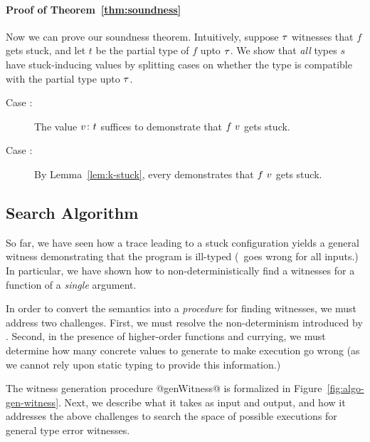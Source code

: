 \paragraph{Proof of Theorem~\ref{thm:soundness}}
%
Now we can prove our soundness theorem. Intuitively, suppose $\tau$
witnesses that $f$ gets stuck, and let $t$ be the partial type of $f$
upto $\tau$. We show that \emph{all} types $s$ have stuck-inducing
values by splitting cases on whether the type is compatible with the
partial type upto $\tau$.
%
\begin{description}
  \item[Case :]
   The value ${v} \colon {t}$ suffices to demonstrate that $f \ v$
   gets stuck.
  \item[Case :]
   By Lemma~\ref{lem:k-stuck}, every  demonstrates that
   $f \ v$ gets stuck.
\end{description}


\subsection{Search Algorithm}
\label{sec:search-algorithm}
%
So far, we have seen how a trace leading to a stuck configuration yields
a general witness demonstrating that the program is ill-typed (\ie\ goes
wrong for all inputs.)
In particular, we have shown how to non-deterministically find a witnesses
for a function of a \emph{single} argument.

In order to convert the semantics into a \emph{procedure} for finding
witnesses, we must address two challenges.
%
First, we must resolve the non-determinism introduced by \gensym.
%
Second, in the presence of higher-order functions and currying,
we must determine how many concrete values to generate to make
execution go wrong (as we cannot rely upon static typing to
provide this information.)

The witness generation procedure @genWitness@ is formalized in
Figure~\ref{fig:algo-gen-witness}.
%
Next, we describe what it takes as input and output, and how it
addresses the above challenges to search the space of possible
executions for general type error witnesses.

